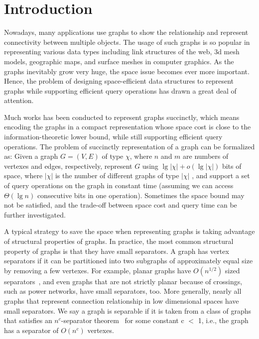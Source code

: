 \documentclass[12pt,glossary]{dalthesis}
\begin{document}
\mainmatter

\chapter{Introduction}

Nowadays, many applications use graphs to show the relationship and represent connectivity between multiple objects. The usage of such graphs is so popular in representing various data types including link structures of the web, 3d mesh models, geographic maps, and surface meshes in computer graphics. As the graphs inevitably grow very huge, the space issue becomes ever more important. Hence, the problem of designing space-efficient data structures to represent graphs while supporting efficient query operations has drawn a great deal of attention. 

\bigskip
Much works has been conducted to represent graphs succinctly, which means encoding the graphs in a compact representation whose space cost is close to the information-theoretic lower bound, while still supporting efficient query operations. The problem of succinctly representation of a graph can be formalized as: Given a graph $G = (V, E)$ of type $\chi$, where $n$ and $m$ are numbers of vertexes and edges, respectively, represent $G$ using $\lg | \chi | + o(\lg | \chi | )$ bits of space, where $|\chi|$ is the number of different graphs of type $|\chi|$ , and support a set of query operations on the graph in constant time (assuming we can access $\Theta(\lg n)$ consecutive bits in one operation). Sometimes the space bound may not be satisfied, and the trade-off between space cost and query time can be further investigated.  

\bigskip


A typical strategy to save the space when representing graphs is taking advantage of structural properties of graphs. In practice, the most common structural property of graphs is that they have small separators. A graph has vertex separators if it can be partitioned into two subgraphs of approximately equal size by removing a few vertexes. For example, planar graphs have $O(n^{1/2})$ sized separators~\cite{separator-theorem}, and even graphs that are not strictly planar because of crossings, such as power networks, have small separators, too. More generally, nearly all graphs that represent connection relationship in low dimensional spaces have small separators. We say a graph is separable if it is taken from a class of graphs that satisfies an $n^{c}$-separator theorem~\cite{separator-theorem} for some constant c $<$ 1, i.e., the graph has a separator of $O(n^{c})$ vertexes.
\end{document}
